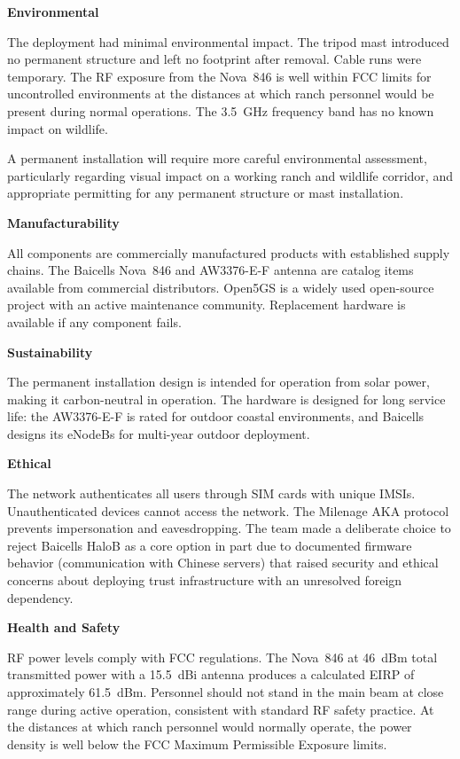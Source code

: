 \documentclass[
    left=1.5in,
    right=1.25in,
    top=1.25in,
    bottom=1.25in
]{CalPolySeniorProject}
\begin{document}
\textbf{Environmental}

The deployment had minimal environmental impact. The tripod mast introduced no
permanent structure and left no footprint after removal. Cable runs were
temporary. The RF exposure from the Nova~846 is well within FCC limits for
uncontrolled environments at the distances at which ranch personnel would be
present during normal operations. The 3.5~GHz frequency band has no known
impact on wildlife.

A permanent installation will require more careful environmental assessment,
particularly regarding visual impact on a working ranch and wildlife corridor,
and appropriate permitting for any permanent structure or mast installation.

\textbf{Manufacturability}

All components are commercially manufactured products with established supply
chains. The Baicells Nova~846 and AW3376-E-F antenna are catalog items available
from commercial distributors. Open5GS is a widely used open-source project with
an active maintenance community. Replacement hardware is available if any
component fails.

\textbf{Sustainability}

The permanent installation design is intended for operation from solar power,
making it carbon-neutral in operation. The hardware is designed for long service
life: the AW3376-E-F is rated for outdoor coastal environments, and Baicells
designs its eNodeBs for multi-year outdoor deployment.

\textbf{Ethical}

The network authenticates all users through SIM cards with unique IMSIs.
Unauthenticated devices cannot access the network. The Milenage AKA protocol
prevents impersonation and eavesdropping. The team made a deliberate choice to
reject Baicells HaloB as a core option in part due to documented firmware
behavior (communication with Chinese servers) that raised security and ethical
concerns about deploying trust infrastructure with an unresolved foreign
dependency.

\textbf{Health and Safety}

RF power levels comply with FCC regulations. The Nova~846 at 46~dBm total
transmitted power with a 15.5~dBi antenna produces a calculated EIRP of
approximately 61.5~dBm. Personnel should not stand in the main beam at close
range during active operation, consistent with standard RF safety practice. At
the distances at which ranch personnel would normally operate, the power density
is well below the FCC Maximum Permissible Exposure limits.
\end{document}
